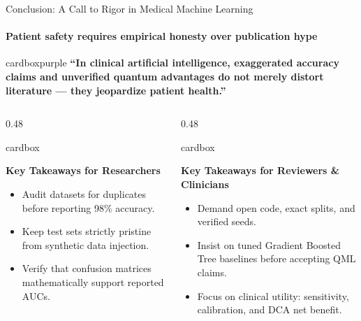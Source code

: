 \documentclass[aspectratio=169, 10pt]{beamer}
\newcommand{\cardbox}[3]{%
  \begin{beamercolorbox}[wd=\linewidth,rounded=true,sep=2.5pt]{cardbox}%
    {\bfseries\scriptsize\color{#1}#2\par}\vspace*{1pt}%
    {\footnotesize #3}%
  \end{beamercolorbox}%
}
\begin{document}
\begin{frame}{Conclusion: A Call to Rigor in Medical Machine Learning}
  \framesubtitle{Patient safety requires empirical honesty over publication hype}

  \begin{center}
    \begin{minipage}{0.85\linewidth}
      \begin{beamercolorbox}[wd=\linewidth,rounded=true,sep=6pt,center]{cardboxpurple}
        {\large\bfseries\color{DeepPurple} ``In clinical artificial intelligence, exaggerated accuracy claims and unverified quantum advantages do not merely distort literature --- they jeopardize patient health.''}
      \end{beamercolorbox}
    \end{minipage}
  \end{center}

  \vspace*{4pt}
  \begin{columns}[T]
    \begin{column}{0.48\textwidth}
      \cardbox{DeepPurple}{Key Takeaways for Researchers}{
        \begin{itemize}\setlength\itemsep{1.5pt}\scriptsize
          \item Audit datasets for duplicates before reporting 98\% accuracy.
          \item Keep test sets strictly pristine from synthetic data injection.
          \item Verify that confusion matrices mathematically support reported AUCs.
        \end{itemize}
      }
    \end{column}

    \begin{column}{0.48\textwidth}
      \cardbox{TealAccent}{Key Takeaways for Reviewers \& Clinicians}{
        \begin{itemize}\setlength\itemsep{1.5pt}\scriptsize
          \item Demand open code, exact splits, and verified seeds.
          \item Insist on tuned Gradient Boosted Tree baselines before accepting QML claims.
          \item Focus on clinical utility: sensitivity, calibration, and DCA net benefit.
        \end{itemize}
      }
    \end{column}
  \end{columns}
\end{frame}
\end{document}

